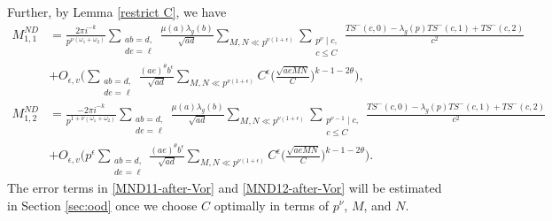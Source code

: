 \documentclass[12pt]{amsart}
\theoremstyle{plain}
\theoremstyle{definition}
\begin{document}
Further, by Lemma \ref{restrict C}, we have    \begin{align}\label{MND11-after-Vor}
     M^{ND}_{1, 1}
    &=  \frac{2\pi i^{-k}}{ p^{\nu (\omega_1+\omega_2)}}
    \sum_{\substack{ab=d,\\ de=\ell}} \frac{\mu(a) \lambda_g(b)}{\sqrt{ad}} 
    \sum_{M, N \ll p^{\nu(1+\epsilon)}} \sum_{\substack{p^\nu \mid c,\\ c\leq C }} \frac{TS^-(c, 0) - \lambda_g(p)TS^-(c, 1)+TS^-(c, 2)}{c^2} \nonumber\\
    &+O_{\epsilon, v}\bigg( { \sum_{\substack{ab=d,  \\ de=\ell}} \frac{(ae)^{\theta}b^{\epsilon}}{\sqrt{ad}}}  \sum_{M, N \ll p^{\nu(1+\epsilon)}}C^{\epsilon}\Big(\frac{\sqrt{aeMN}}{C}\Big)^{k-1-2\theta} \bigg), 
    \end{align}
   \begin{align} \label{MND12-after-Vor} M^{ND}_{1, 2}
    &=  \tfrac{-2\pi i^{-k}}{p^{1+\nu (\omega_1+\omega_2)}}
    \sum_{\substack{ab=d,  \\ de=\ell}} \tfrac{\mu(a) \lambda_g(b)}{\sqrt{ad}} 
    \sum_{M, N \ll p^{\nu(1+\epsilon)}}\sum_{\substack{p^{\nu-1} \mid c,\\ c\leq C}} \frac{TS^-(c, 0) - \lambda_g(p)TS^-(c, 1)+TS^-(c, 2)}{c^2} \nonumber\\
    &+O_{\epsilon, v}\bigg( p^{\epsilon}{ \sum_{\substack{ab=d,  \\ de=\ell}} \frac{(ae)^{\theta}b^{\epsilon}}{\sqrt{ad}}} \sum_{M, N \ll p^{\nu(1+\epsilon)}}C^{\epsilon}\Big(\frac{\sqrt{aeMN}}{C}\Big)^{k-1-2\theta} \bigg).
    \end{align}
The error terms in \eqref{MND11-after-Vor} and \eqref{MND12-after-Vor} will be estimated in Section \ref{sec:ood} once we choose $C$ optimally in terms of $p^{\nu}$, $M$, and $N$. 
\end{document}
